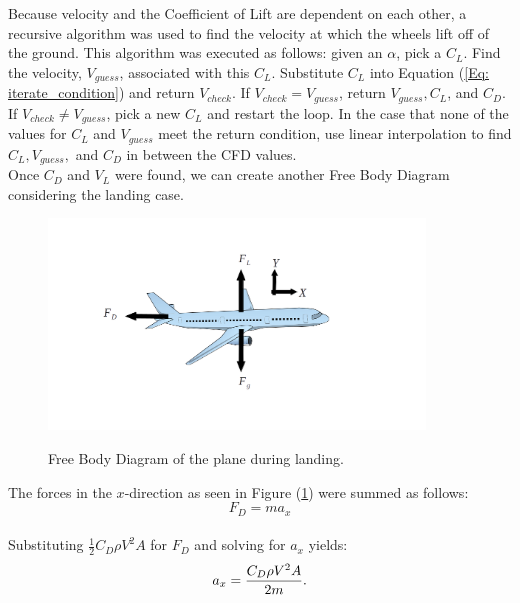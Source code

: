 \documentclass[
	12pt, %
]{fluids_report_style}
\begin{document}
\noindent Because velocity and the Coefficient of Lift are dependent on each other, a recursive algorithm was used to find the velocity at which the wheels lift off of the ground. This algorithm was executed as follows: given an $\alpha$, pick a $C_L$. Find the velocity, $V_{guess}$, associated with this $C_L$. Substitute $C_L$ into Equation (\ref{Eq: iterate_condition}) and return $V_{check}$. If $V_{check} = V_{guess}$, return $V_{guess}, C_L$, and $C_D$. If $V_{check} \neq V_{guess}$, pick a new $C_L$ and restart the loop. In the case that none of the values for $C_L$ and $V_{guess}$ meet the return condition, use linear interpolation to find $C_L, V_{guess},$ and $C_D$ in between the CFD values.\\

\noindent Once $C_D$ and $V_L$ were found, we can create another Free Body Diagram considering the landing case.

\begin{figure}[ht!]
    \centering
    {\includegraphics[width=10cm]{figures/fbd_2.png}}%
    \caption{Free Body Diagram of the plane during landing.}
    \label{fig:landing}
\end{figure}  

\noindent The forces in the $x$-direction as seen in Figure (\ref{fig:landing}) were summed as follows: \\

\begin{equation}
    F_D = ma_x
    \label{Eq: I_don't_know}
\end{equation}\\

\noindent Substituting $\frac{1}{2} C_D \rho V^2 A$ for $F_D$ and solving for $a_x$ yields:\\

\begin{equation}
    a_x = \frac{C_D \rho V^2 A}{2 m}. \\
\end{equation}\\
\end{document}
